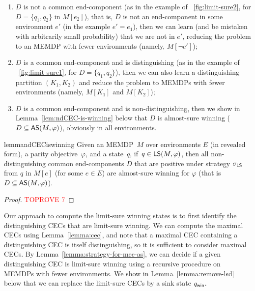\documentclass[a4paper,USenglish,cleveref, autoref, thm-restate]{lipics-v2021}
\newcommand\almostsure{\textrm{\sf AS}}
\newcommand\limitsure{\textrm{\sf LS}}
\def\winabsorb{q_{\sf win}}
\begin{document}
\vspace{-0.1cm}
\begin{enumerate}
\item $D$ is not a common end-component (as in the example of \figurename~\ref{fig:limit-sure2}, for $D = \{q_1,q_2\}$ in $M[e_2]$),
that is, $D$ is not an end-component in some environment $e'$ (in the example $e' = e_1$), then we can 
learn (and be mistaken with arbitrarily small probability) that we are not in $e'$,
reducing the problem to an MEMDP with fewer environments (namely, $M[\lnot e']$);

\item $D$ is a common end-component and is distinguishing (as in the example of \figurename~\ref{fig:limit-sure1}, 
for $D = \{q_1,q_2\}$), then we can also learn a distinguishing partition $(K_1,K_2)$
and reduce the problem to MEMDPs with fewer environments (namely, $M[K_1]$ and $M[K_2]$);

\item $D$ is a common end-component and is non-distinguishing, then 
we show in Lemma~\ref{lem:ndCEC-is-winning} below that $D$ is almost-sure winning 
($D \subseteq \almostsure(M, \varphi)$), obviously in all environments.
\end{enumerate}
\vspace{-0.2cm}


\begin{restatable}{lemma}{ndCECiswinning}
\label{lem:ndCEC-is-winning}
	Given an MEMDP~$M$ over environments $E$ (in revealed form), a parity objective~$\varphi$, and a state~$q$,
	if~$q \in \limitsure(M,\varphi)$, then all non-distinguishing common end-components $D$
	that are positive under strategy $\sigma_{\limitsure}$ from $q$ in $M[e]$ (for some $e \in E$)
	are almost-sure winning for $\varphi$ (that is $D \subseteq \almostsure(M,\varphi)$).
\end{restatable}


\begin{proof}\textcolor{red}{TOPROVE 7}\end{proof}

Our approach to compute the limit-sure winning states is to first identify the
distinguishing CECs that are limit-sure winning. We can compute
the maximal CECs using Lemma~\ref{lemma:cec}, and note that
a maximal CEC containing a distinguishing CEC is itself distinguishing, so it is sufficient
to consider maximal CECs. By Lemma~\ref{lemma:strategy-for-mec-as}, we can decide
if a given distinguishing CEC is limit-sure winning using 
a recursive procedure on MEMDPs with fewer environments.
We show in Lemma~\ref{lemma:remove-lsd} below that we can replace the limit-sure 
CECs by a sink state $\winabsorb$.
\end{document}
